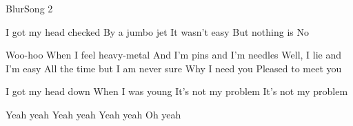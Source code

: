 \documentclass[a4paper,11pt,french]{article}
\begin{document}

\begin{Song}{Blur}{Song 2}

\begin{Verse}
I got my head checked
By a jumbo jet
It wasn't easy
But nothing is 
No
\end{Verse}
\espaceInterStrophe

\begin{Chorus}
Woo-hoo
When I feel heavy-metal
And I'm pins and I'm needles
Well, I lie and I'm easy
All the time but I am never sure
Why I need you
Pleased to meet you
\end{Chorus}
\espaceInterStrophe

\begin{Verse}
I got my head down
When I was young
It's not my problem
It's not my problem
\end{Verse}
\espaceInterStrophe

\tochorus
\espaceInterStrophe

\begin{Chorus}
Yeah yeah
Yeah yeah
Yeah yeah
Oh yeah
\end{Chorus}

\vfill

\begin{multicols}{2}

\gridGroupNormal

\begin{Chords}
\hline
\\\hline
\end{Chords}
\espaceInterGrille


\begin{Chords}
\hline
\\\hline
\end{Chords}

\end{multicols}

\vfill

\end{Song}

\end{document}
